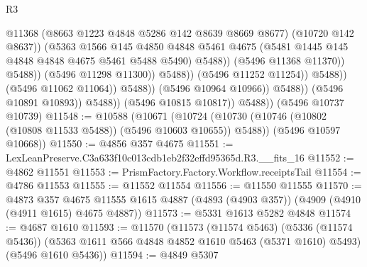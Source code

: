 \begin{lexlean}{R3}
\begin{coremodule}
                                                  @11368
                                                  (@8663 @1223 @4848 @5286 @142 @8639 @8669 @8677)
                                                  (@10720 @142 @8637))
                                                (@5363
                                                  @1566
                                                  @145
                                                  @4850
                                                  @4848
                                                  @5461
                                                  @4675
                                                  (@5481
                                                    @1445
                                                    @145
                                                    @4848
                                                    @4848
                                                    @4675
                                                    @5461
                                                    @5488
                                                    @5490)
                                                  @5488))
                                              (@5496 @11368 @11370))
                                            @5488))
                                        (@5496 @11298 @11300))
                                      @5488))
                                  (@5496 @11252 @11254))
                                @5488))
                            (@5496 @11062 @11064))
                          @5488))
                      (@5496 @10964 @10966))
                    @5488))
                (@5496 @10891 @10893))
              @5488))
          (@5496 @10815 @10817))
        @5488))
    (@5496 @10737 @10739)
@11548 := @10588
    (@10671
      (@10724 (@10730 (@10746 (@10802 (@10808 @11533 @5488)) (@5496 @10603 @10655)) @5488))
      (@5496 @10597 @10668))
@11550 := @4856 @357 @4675
@11551 := LexLeanPreserve.C3a633f10c013cdb1eb2f32effd95365d.R3.__fits_16
@11552 := @4862 @11551
@11553 := PrismFactory.Factory.Workflow.receiptsTail
@11554 := @4786 @11553
@11555 := @11552 @11554
@11556 := @11550 @11555
@11570 := @4873
    @357
    @4675
    @11555
    @1615
    @4887
    (@4893 (@4903 @357))
    (@4909 (@4910 (@4911 @1615) @4675 @4887))
@11573 := @5331 @1613 @5282 @4848
@11574 := @4687 @1610
@11593 := @11570
    (@11573
      (@11574 @5463)
      (@5336 (@11574 @5436))
      (@5363 @1611 @566 @4848 @4852 @1610 @5463 (@5371 @1610) @5493)
      (@5496 @1610 @5436))
@11594 := @4849 @5307

\end{coremodule}
\end{lexlean}
